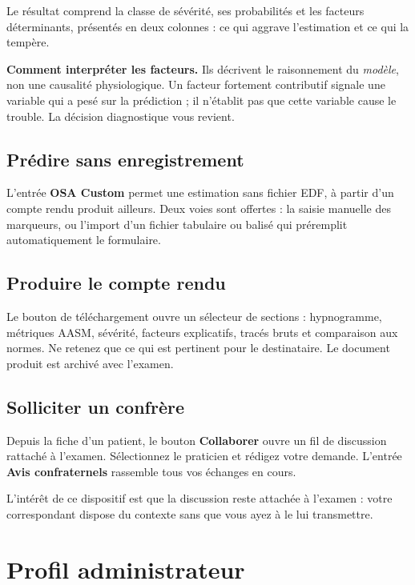 Le résultat comprend la classe de sévérité, ses probabilités et les
facteurs déterminants, présentés en deux colonnes : ce qui aggrave
l'estimation et ce qui la tempère.

\begin{samepage}
\noindent\textbf{Comment interpréter les facteurs.} Ils décrivent le raisonnement du
\emph{modèle}, non une causalité physiologique. Un facteur fortement contributif
signale une variable qui a pesé sur la prédiction ; il n'établit pas que cette variable
cause le trouble. La décision diagnostique vous revient.
\end{samepage}

\subsection*{Prédire sans enregistrement}

L'entrée \textbf{OSA Custom} permet une estimation sans fichier EDF, à partir d'un
compte rendu produit ailleurs. Deux voies sont offertes : la saisie manuelle des
marqueurs, ou l'import d'un fichier tabulaire ou balisé qui préremplit automatiquement
le formulaire.

\subsection*{Produire le compte rendu}

Le bouton de téléchargement ouvre un sélecteur de sections : hypnogramme, métriques
AASM, sévérité, facteurs explicatifs, tracés bruts et comparaison aux normes. Ne
retenez que ce qui est pertinent pour le destinataire. Le document produit est archivé
avec l'examen.

\subsection*{Solliciter un confrère}

Depuis la fiche d'un patient, le bouton \textbf{Collaborer} ouvre un fil de discussion
rattaché à l'examen. Sélectionnez le praticien et rédigez votre demande. L'entrée
\textbf{Avis confraternels} rassemble tous vos échanges en cours.

L'intérêt de ce dispositif est que la discussion reste attachée à l'examen : votre
correspondant dispose du contexte sans que vous ayez à le lui transmettre.

\section{Profil administrateur}

